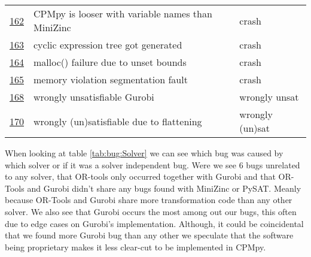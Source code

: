 \begin{table}[]
\begin{tabular}{lll}
		\href{https://github.com/CPMpy/cpmpy/issues/162}{162} & CPMpy is looser with variable names than MiniZinc & crash           \\
		\href{https://github.com/CPMpy/cpmpy/issues/163}{163} & cyclic expression tree got generated               & crash           \\
		\href{https://github.com/CPMpy/cpmpy/issues/164}{164} & malloc() failure due to unset bounds              & crash           \\
		\href{https://github.com/CPMpy/cpmpy/issues/165}{165} & memory violation segmentation fault               & crash           \\
		\href{https://github.com/CPMpy/cpmpy/issues/168}{168} & wrongly unsatisfiable Gurobi                      & wrongly unsat   \\
		\href{https://github.com/CPMpy/cpmpy/issues/170}{170} & wrongly (un)satisfiable due to flattening         & wrongly (un)sat \\ \bottomrule
	\end{tabular}
\end{table}

When looking at table \ref{tab:bug:Solver} we can see which bug was caused by which solver or if it was a solver independent bug. Were we see 6 bugs unrelated to any solver, that OR-tools only occurred together with Gurobi and that OR-Tools and Gurobi didn't share any bugs found with MiniZinc or PySAT. Meanly because OR-Tools and Gurobi share more transformation code than any other solver. We also see that Gurobi occurs the most among out our bugs, this often due to edge cases on Gurobi's implementation. Although, it could be coincidental that we found more Gurobi bug than any other we speculate that the software being proprietary makes it less clear-cut to be implemented in CPMpy.

